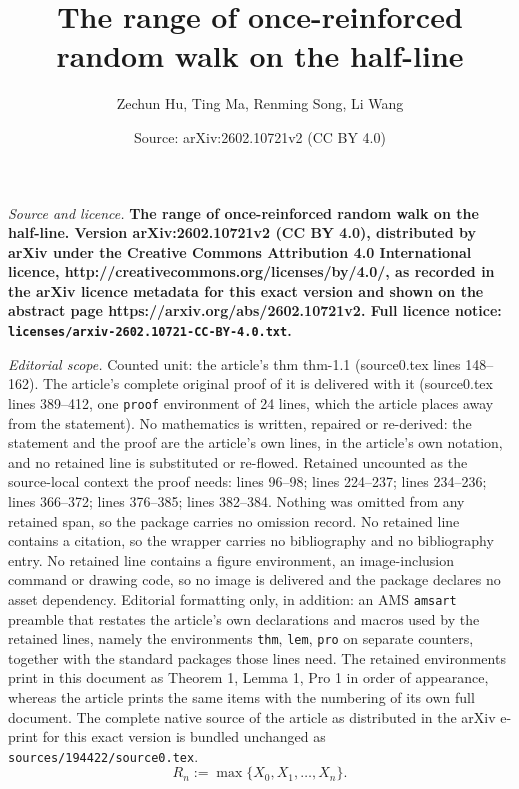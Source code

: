 \documentclass[10pt,a4paper]{amsart}
\title{\bf The range of once-reinforced random walk on the half-line}
\author{Zechun Hu, Ting Ma, Renming Song, Li Wang}
\date{Source: arXiv:2602.10721v2 (CC BY 4.0)}
\begin{document}
\maketitle

\noindent\emph{Source and licence.} \bf The range of once-reinforced random walk on the half-line. Version arXiv:2602.10721v2 (CC BY 4.0), distributed by arXiv under the Creative Commons Attribution 4.0 International licence, http://creativecommons.org/licenses/by/4.0/, as recorded in the arXiv licence metadata for this exact version and shown on the abstract page https://arxiv.org/abs/2602.10721v2. Full licence notice: \texttt{licenses/arxiv-2602.10721-CC-BY-4.0.txt}.\par\smallskip

\noindent\textit{Editorial scope.} Counted unit: the article's thm thm-1.1 (source0.tex lines 148--162). The article's complete original proof of it is delivered with it (source0.tex lines 389--412, one \texttt{proof} environment of 24 lines, which the article places away from the statement). No mathematics is written, repaired or re-derived: the statement and the proof are the article's own lines, in the article's own notation, and no retained line is substituted or re-flowed.  Retained uncounted as the source-local context the proof needs: lines 96--98; lines 224--237; lines 234--236; lines 366--372; lines 376--385; lines 382--384.  Nothing was omitted from any retained span, so the package carries no omission record.  No retained line contains a citation, so the wrapper carries no bibliography and no bibliography entry.  No retained line contains a figure environment, an image-inclusion command or drawing code, so no image is delivered and the package declares no asset dependency.  Editorial formatting only, in addition: an AMS \texttt{amsart} preamble that restates the article's own declarations and macros used by the retained lines, namely the environments \texttt{thm}, \texttt{lem}, \texttt{pro} on separate counters, together with the standard packages those lines need.  The retained environments print in this document as Theorem 1, Lemma 1, Pro 1 in order of appearance, whereas the article prints the same items with the numbering of its own full document.  The complete native source of the article as distributed in the arXiv e-print for this exact version is bundled unchanged as \texttt{sources/194422/source0.tex}.
\begin{equation}\label{2.2}
R_{n}:= \max\{X_{0},X_{1},\ldots, X_{n}\}.
\end{equation}
\end{document}
